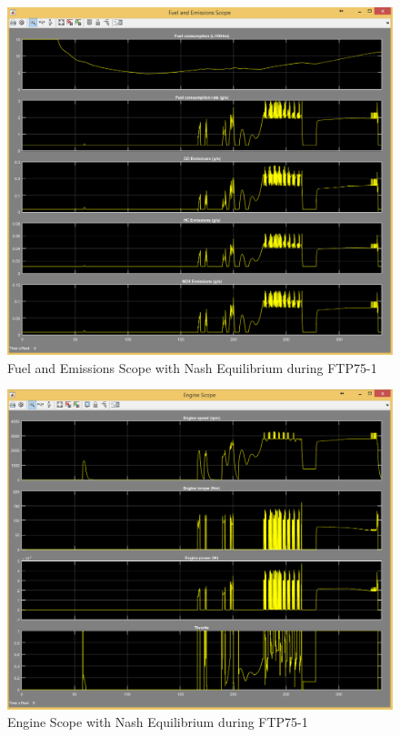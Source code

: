 \begin{figure}[h]
\centering
\includegraphics[scale=0.4]{figures/NashEquilibrium/FTP75-1/fuelEmissions13Juni}
\caption{Fuel and Emissions Scope with Nash Equilibrium during FTP75-1}
\label{fig:fene1}
\end{figure}

\begin{figure}[h]
\centering
\includegraphics[scale=0.37]{figures/NashEquilibrium/FTP75-1/engine13Juni}
\caption{Engine Scope with Nash Equilibrium during FTP75-1}
\label{fig:ene1}
\end{figure}

